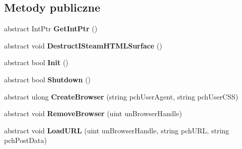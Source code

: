 \subsection*{Metody publiczne}
\begin{DoxyCompactItemize}
\item 
\mbox{\label{class_valve_1_1_steamworks_1_1_i_steam_h_t_m_l_surface_af9b930b1aef525f8fea22d55fdd35571}} 
abstract Int\+Ptr {\bfseries Get\+Int\+Ptr} ()
\item 
\mbox{\label{class_valve_1_1_steamworks_1_1_i_steam_h_t_m_l_surface_a9349420774347336f0949bba122179af}} 
abstract void {\bfseries Destruct\+I\+Steam\+H\+T\+M\+L\+Surface} ()
\item 
\mbox{\label{class_valve_1_1_steamworks_1_1_i_steam_h_t_m_l_surface_ad654601a94e23a0d465bb0809479233f}} 
abstract bool {\bfseries Init} ()
\item 
\mbox{\label{class_valve_1_1_steamworks_1_1_i_steam_h_t_m_l_surface_a36dc1e883a6333a7239af6c5e84d6422}} 
abstract bool {\bfseries Shutdown} ()
\item 
\mbox{\label{class_valve_1_1_steamworks_1_1_i_steam_h_t_m_l_surface_a7ce09218f91e9f561a0c9f316cc877f6}} 
abstract ulong {\bfseries Create\+Browser} (string pch\+User\+Agent, string pch\+User\+C\+SS)
\item 
\mbox{\label{class_valve_1_1_steamworks_1_1_i_steam_h_t_m_l_surface_a0ae0e3ff079e33bed9b8fc86867badc0}} 
abstract void {\bfseries Remove\+Browser} (uint un\+Browser\+Handle)
\item 
\mbox{\label{class_valve_1_1_steamworks_1_1_i_steam_h_t_m_l_surface_adba79cb4536b7529fd6f9e0e4dc7c724}} 
abstract void {\bfseries Load\+U\+RL} (uint un\+Browser\+Handle, string pch\+U\+RL, string pch\+Post\+Data)
\item 
\mbox{\label{class_valve_1_1_steamworks_1_1_i_steam_h_t_m_l_surface_a006818d2a4cb1e037226b8fdf822aa96}} 

\end{DoxyCompactItemize}
